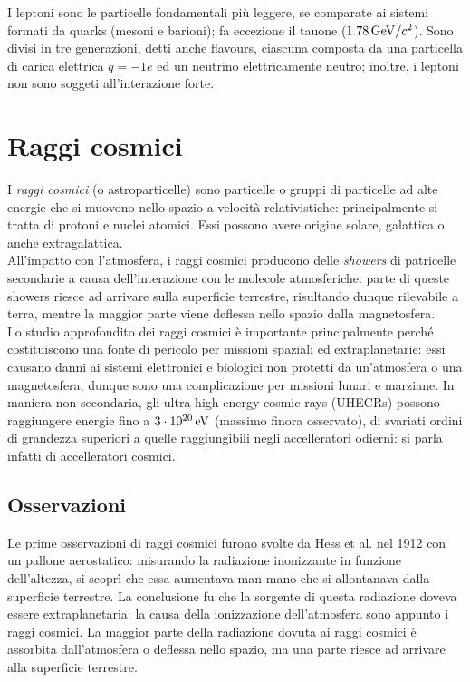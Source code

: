 
I leptoni sono le particelle fondamentali più leggere, se comparate ai sistemi formati da quarks (mesoni e barioni); fa eccezione il tauone ($ 1.78\,\mathrm{GeV}/c^2 $). Sono divisi in tre generazioni, detti anche flavours, ciascuna composta da una particella di carica elettrica $ q = -1e $ ed un neutrino elettricamente neutro; inoltre, i leptoni non sono soggeti all'interazione forte.

\section{Raggi cosmici}

I \textit{raggi cosmici} (o astroparticelle) sono particelle o gruppi di particelle ad alte energie che si muovono nello spazio a velocità relativistiche: principalmente si tratta di protoni e nuclei atomici. Essi possono avere origine solare, galattica o anche extragalattica.\\
All'impatto con l'atmosfera, i raggi cosmici producono delle \textit{showers} di patricelle secondarie a causa dell'interazione con le molecole atmosferiche: parte di queste showers riesce ad arrivare sulla superficie terrestre, risultando dunque rilevabile a terra, mentre la maggior parte viene deflessa nello spazio dalla magnetosfera.\\
Lo studio approfondito dei raggi cosmici è importante principalmente perché costituiscono una fonte di pericolo per missioni spaziali ed extraplanetarie: essi causano danni ai sistemi elettronici e biologici non protetti da un'atmosfera o una magnetosfera, dunque sono una complicazione  per missioni lunari e marziane. In maniera non secondaria, gli ultra-high-energy cosmic rays (UHECRs) possono raggiungere energie fino a $ 3\cdot10^{20}\,\mathrm{eV} $ (massimo finora osservato), di svariati ordini di grandezza superiori a quelle raggiungibili negli accelleratori odierni: si parla infatti di accelleratori cosmici.

\subsection{Osservazioni}

Le prime osservazioni di raggi cosmici furono svolte da Hess et al. nel 1912 con un pallone aerostatico: misurando la radiazione inonizzante in funzione dell'altezza, si scoprì che essa aumentava man mano che si allontanava dalla superficie terrestre. La conclusione fu che la sorgente di questa radiazione doveva essere extraplanetaria: la causa della ionizzazione dell'atmosfera sono appunto i raggi cosmici. La maggior parte della radiazione dovuta ai raggi cosmici è assorbita dall'atmosfera o deflessa nello spazio, ma una parte riesce ad arrivare alla superficie terrestre.

